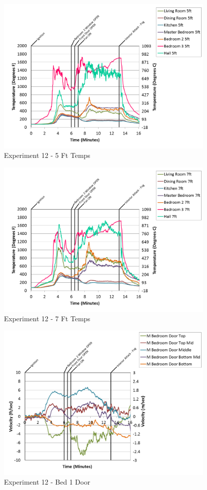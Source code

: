\documentclass{article}
\begin{document}
\begin{appendices}
\begin{figure}[h!]
	\centering
	\includegraphics[height=3.05in]{0_Images/Results_Charts/Exp_12_Charts/5FtTemps.png}
	\caption{Experiment 12 - 5 Ft Temps}
\end{figure}


\begin{figure}[h!]
	\centering
	\includegraphics[height=3.05in]{0_Images/Results_Charts/Exp_12_Charts/7FtTemps.png}
	\caption{Experiment 12 - 7 Ft Temps}
\end{figure}

\clearpage

\begin{figure}[h!]
	\centering
	\includegraphics[height=3.05in]{0_Images/Results_Charts/Exp_12_Charts/Bed1Door.png}
	\caption{Experiment 12 - Bed 1 Door}
\end{figure}



\end{appendices}
\end{document}
